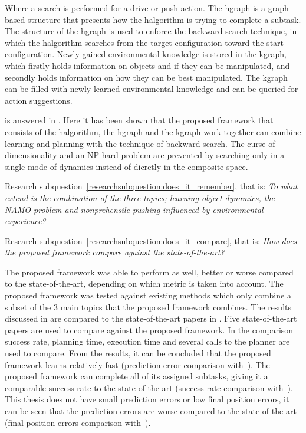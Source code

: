 Where a search is performed for a drive or push action. The \ac{hgraph} is a graph-based structure that presents how the \ac{halgorithm} is trying to complete a subtask. The structure of the \ac{hgraph} is used to enforce the backward search technique, in which the \ac{halgorithm} searches from the target configuration toward the start configuration. Newly gained environmental knowledge is stored in the \ac{kgraph}, which firstly holds information on objects and if they can be manipulated, and secondly holds information on how they can be best manipulated. The \ac{kgraph} can be filled with newly learned environmental knowledge and can be queried for action suggestions.\bs

is answered in . Here it has been shown that the proposed framework that consists of the \acl{halgorithm}, the \acl{hgraph} and the \acl{kgraph} work together can combine learning and planning with the technique of backward search. The curse of dimensionality and an \ac{NP-hard} problem are prevented by searching only in a single mode of dynamics instead of dicretly in the composite space.



Research subquestion~\ref{researchsubquestion:does_it_remember}, that is: \textit{
To what extend is the combination of the three topics; learning object dynamics, the \ac{NAMO} problem and nonprehensile pushing influenced by environmental experience?}



Research subquestion~\ref{researchsubquestion:does_it_compare}, that is: \textit{How does the proposed framework compare against the state-of-the-art?}

The proposed framework was able to perform as well, better or worse compared to the state-of-the-art, depending on which metric is taken into account. The proposed framework was tested against existing methods which only combine a subset of the 3 main topics that the proposed framework combines. 
The results discussed in  are compared to the state-of-the-art papers in . Five state-of-the-art papers are used to compare against the proposed framework. In the comparison success rate, planning time, execution time and several calls to the planner are used to compare. From the results, it can be concluded that the proposed framework learns relatively fast (prediction error comparison with~\cite{wang_affordancebased_2020}). The proposed framework can complete all of its assigned subtasks, giving it a comparable success rate to the state-of-the-art (success rate comparison with~\cite{ellis_navigation_2022}). This thesis does not have small prediction errors or low final position errors, it can be seen that the prediction errors are worse compared to the state-of-the-art (final position errors comparison with~\cite{sabbaghnovin_model_2021}). \bs

